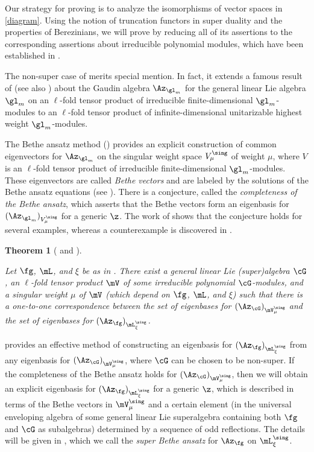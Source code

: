 \documentclass[11pt, reqno]{amsart}
\newtheorem{thm}{Theorem}[section]
\theoremstyle{definition}
\theoremstyle{remark}
\numberwithin{equation}{section}
\begin{document}
Our strategy for proving  is to analyze the isomorphisms of vector spaces in \eqref{diagram}.
Using the notion of truncation functors in super duality and the properties of Berezinians, we will prove  by reducing all of its assertions to the corresponding assertions about irreducible polynomial modules, which have been established in \cite{ChL25}.

The non-super case of  merits special mention. 
In fact, it extends a famous result of \cite{MTV09-1, MTV09-2} (see also \cite{Ry20}) about the Gaudin algebra $\Az_{\gl_m}$ for the general linear Lie algebra $\gl_m$ on an $\ell$-fold tensor product of irreducible finite-dimensional $\gl_m$-modules to an $\ell$-fold tensor product of infinite-dimensional unitarizable highest weight $\gl_m$-modules.

The Bethe ansatz method (\cite{BF, FFR}) provides an explicit construction of common eigenvectors for $\Az_{\gl_m}$ on the singular weight space $V^\sing_\mu$ of weight $\mu$, where $V$ is an $\ell$-fold tensor product of irreducible finite-dimensional $\gl_m$-modules.
These eigenvectors are called \emph{Bethe vectors} and are labeled by the solutions of the Bethe ansatz equations (see ).
There is a conjecture, called the \emph{completeness of the Bethe ansatz}, which asserts that the Bethe vectors form an eigenbasis for $(\Az_{\gl_m})_{V^\sing_\mu}$ for a generic $\z$.
The work of \cite{MV05} shows that the conjecture holds for several examples, whereas a counterexample is discovered in \cite{MV07}.


\begin{thm} [ and ] \label{main2}

Let $\fg$, $\mL$, and $\xi$ be as in .
There exist a general linear Lie (super)algebra $\cG$, an $\ell$-fold tensor product $\mV$ of some irreducible polynomial $\cG$-modules, and a singular weight $\mu$ of $\mV$ (which depend on $\fg$, $\mL$, and $\xi$) such that there is a one-to-one correspondence between the set of eigenbases for $(\Az_\cG)_{\mV^\sing_\mu}$ and the set of eigenbases for $(\Az_\fg)_{\mL^\sing_\xi}$.

\end{thm}

 provides an effective method of constructing an eigenbasis for $(\Az_\fg)_{\mL^\sing_\xi}$ from any eigenbasis for $(\Az_\cG)_{\mV^\sing_\mu}$, where $\cG$ can be chosen to be non-super.
If the completeness of the Bethe ansatz holds for $(\Az_\cG)_{\mV^\sing_\mu}$, then we will obtain an explicit eigenbasis for $(\Az_\fg)_{\mL^\sing_\xi}$ for a generic $\z$, which is described in terms of the Bethe vectors in $\mV^\sing_\mu$ and a certain element (in the universal enveloping algebra of some general linear Lie superalgebra containing both $\fg$ and $\cG$ as subalgebras) determined by a sequence of odd reflections.
The details will be given in , which we call the \emph{super Bethe ansatz} for $\Az_\fg$ on $\mL^\sing_\xi$.
\end{document}
